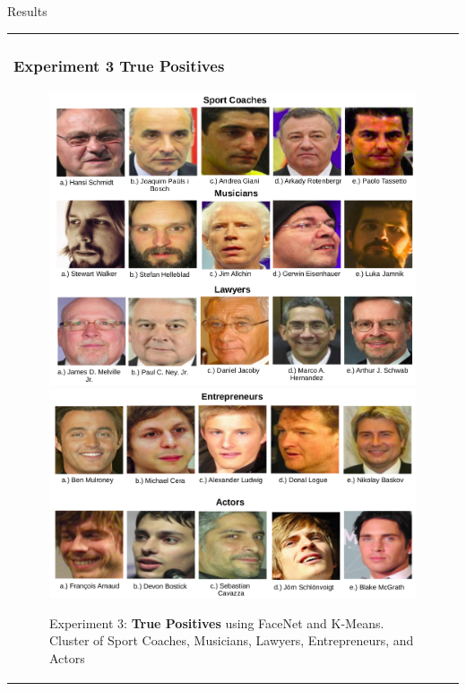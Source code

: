 \documentclass[11pt]{beamer}
\begin{document}
\begin{frame}{Results}
\begin{tabular}{l}
\parbox{1\linewidth}{
\frametitle{Experiment 3 True Positives}
\begin{figure}[H]
 \centering
    \includegraphics[width=0.5\columnwidth]{figures/lawyers.png}
    \includegraphics[width=0.5\columnwidth]{figures/actor.png}
    \caption{Experiment 3: \textbf{True Positives} using FaceNet and K-Means. Cluster of Sport Coaches, Musicians, Lawyers, Entrepreneurs, and Actors}
    \label{fig:ex2tp}
\end{figure}

}
\end{tabular}  
\end{frame}
\end{document}
